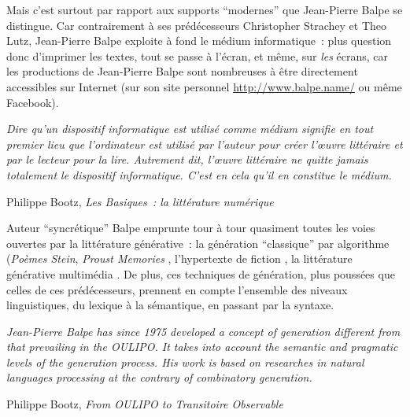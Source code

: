 \documentclass{article}
\newenvironment{citationbox}
{\begin{center}
		\begin{minipage}{.8\textwidth}
		}
		{
		\end{minipage}	
\end{center}
}
\begin{document}
			Mais c'est surtout par rapport aux supports ``modernes'' que Jean-Pierre Balpe se distingue. Car contrairement à ses prédécesseurs Christopher Strachey et Theo Lutz, Jean-Pierre Balpe exploite à fond le médium informatique~: plus question donc d'imprimer les textes, tout se passe à l'écran, et même, sur \textit{les} écrans, car les productions de Jean-Pierre Balpe sont nombreuses à être directement accessibles sur Internet (sur son site personnel \href{http://www.balpe.name/}{http://www.balpe.name/} ou même Facebook).
			\begin{citationbox}
				\textit{Dire qu’un dispositif informatique est utilisé comme médium signifie en tout premier lieu que l’ordinateur est utilisé par l’auteur pour créer l’œuvre littéraire et par le lecteur pour la lire. Autrement dit, l’œuvre littéraire ne quitte jamais totalement le dispositif informatique. C’est en cela qu’il en constitue le médium.}
				\begin{flushright}
					Philippe Bootz, \textit{Les Basiques~: la littérature numérique} \cite{bootz2006}
				\end{flushright}
			\end{citationbox}
			Auteur ``syncrétique'' Balpe emprunte tour à tour quasiment toutes les voies ouvertes par la littérature générative~: la génération ``classique'' par algorithme (\textit{Poèmes Stein}\cite{balpe_stein}, \textit{Proust Memories} \cite{balpe_proust}, l'hypertexte de fiction \cite{balpe_disparition}, la littérature générative multimédia \cite{balpe_videoseries}. De plus, ces techniques de génération, plus poussées que celles de ces prédécesseurs, prennent en compte l'ensemble des niveaux linguistiques, du lexique à la sémantique, en passant par la syntaxe.
			\begin{citationbox}
				\textit{Jean-Pierre Balpe has since 1975 developed a concept of generation different from that prevailing in the OULIPO. It takes into account the semantic and pragmatic levels of the generation process. His work is based on researches in natural languages processing at the contrary of combinatory generation.}
				\begin{flushright}
					Philippe Bootz, \textit{From OULIPO to Transitoire Observable} \cite{bootz2012}
				\end{flushright}
			\end{citationbox}
			
\end{document}
